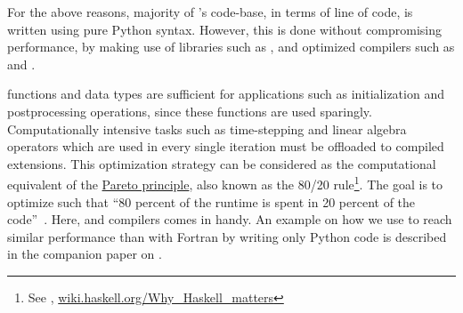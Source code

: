 \documentclass{../jors}
\begin{document}
For the above reasons, majority of 's code-base, in terms of
line of code, is written using pure Python syntax. However, this is done
without compromising performance, by making use of libraries such as \Numpy,
and optimized compilers such as  and .

\Numpy functions and data types are sufficient for applications such as
initialization and postprocessing operations, since these functions are used
sparingly. Computationally intensive tasks such as time-stepping and linear
algebra operators which are used in every single iteration must be offloaded to
compiled extensions.
%
This optimization strategy can be considered as the computational equivalent of
the \href{https://en.wikipedia.org/wiki/Pareto_principle}{Pareto principle}, also
known as the 80/20 rule\footnote{See \citet{behnel_cython2011},
\href{https://wiki.haskell.org/Why_Haskell_matters}{%
wiki.haskell.org/Why\_Haskell\_matters}}.
%
The goal is to optimize such that ``80 percent of the runtime is spent in
20 percent of the code''~\cite[]{meyers2012effective}.
%
Here,  \citep{behnel_cython2011} and 
\citep{guelton2018pythran} compilers comes in handy.
%
An example on how we use  to reach similar performance than with
Fortran by writing only Python code is described in the companion paper on
 \citep{fluidfft}.



\end{document}

